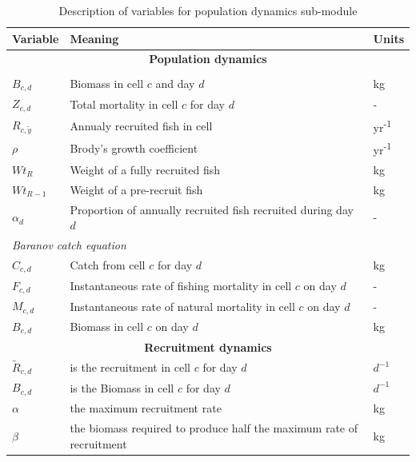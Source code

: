 \documentclass[review]{elsarticle}
\begin{document}
\begin{table}[!ht]
	\centering
	\caption{Description of variables for population dynamics sub-module}
	\label{tab: pop_variable}
	\begin{tabular}{p{1.5cm} p{8cm} p{1.5cm}}
		\toprule
		Variable & Meaning & Units \\
		\hline
		\multicolumn{3}{c}{\textbf{Population dynamics}}  \\
		\hhline{===}
		\multicolumn{3}{l}{\textit{Delay-difference model}} \\
		\hline
		$B_{c,d}$ & Biomass in cell $c$ and day $d$ & kg \\
		$Z_{c,d}$ & Total mortality in cell $c$ for day $d$ & - \\
		$R_{c, \tilde{y}}$  &Annualy recruited fish in cell &  yr\textsuperscript{-1} \\
		$\rho$ & Brody's growth coefficient & yr\textsuperscript{-1} \\
		$Wt_{R}$ & Weight of a fully recruited fish & kg \\
		$Wt_{R-1}$ & Weight of a pre-recruit fish & kg \\
		$\alpha_{d}$ & Proportion of annually recruited fish recruited
		during day $d$ & - \\
		\hline
		\multicolumn{3}{l}{\textit{Baranov catch equation}} \\
		\hline
		$C_{c,d}$ & Catch from cell $c$ for day $d$ & kg \\
		$F_{c,d}$ & Instantaneous rate of fishing mortality in cell $c$
		on day $d$ & - \\
		$M_{c,d}$ & Instantaneous rate of natural mortality in cell $c$
		on day $d$ & - \\
		$B_{c,d}$ & Biomass in cell $c$ on day $d$ & kg \\
		\hline
		\multicolumn{3}{c}{\textbf{Recruitment dynamics}} \\
		\hhline{===}
		$\tilde{R}_{c,d}$ & is the recruitment in cell $c$ for day $d$ & $d^{-1}$ \\
		$B_{c,d}$ & is the Biomass in cell $c$ for day $d$ & $d^{-1}$ \\
		$\alpha$ & the maximum recruitment rate & kg  \\
		$\beta$ & the biomass required to produce half the maximum rate
		of recruitment & kg \\
		\bottomrule
		\end{tabular}
	\end{table}
\end{document}
